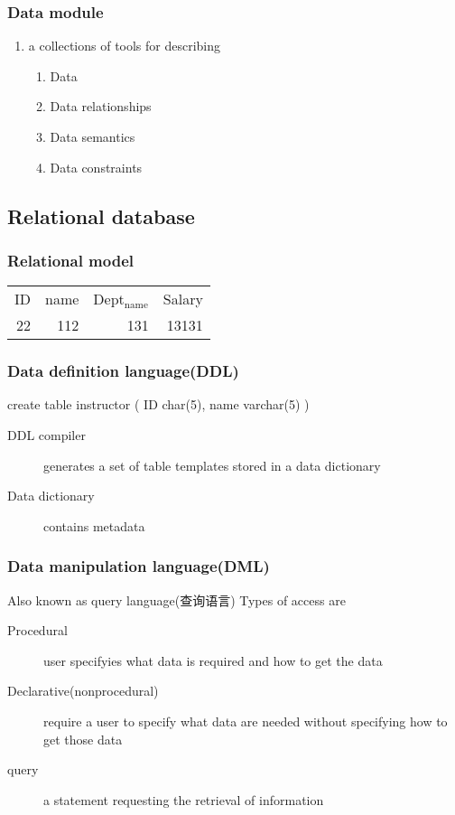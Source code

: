 \documentclass[11pt]{article}
\begin{document}
\subsubsection{Data module}
\label{sec-1-4-3}
\begin{enumerate}
\item a collections of tools for describing
\label{sec-1-4-3-1}
\begin{enumerate}
\item Data
\item Data relationships
\item Data semantics
\item Data constraints
\end{enumerate}
\end{enumerate}
\subsection{Relational database}
\label{sec-1-5}
\subsubsection{Relational model}
\label{sec-1-5-1}
\begin{center}
\begin{tabular}{rrrr}
ID & name & Dept$_{\text{name}}$ & Salary\\
22 & 112 & 131 & 13131\\
\end{tabular}
\end{center}
\subsubsection{Data definition language(DDL)}
\label{sec-1-5-2}
create table instructor (
ID char(5),
name varchar(5)
)
\begin{description}
\item[{DDL compiler}] generates a set of table templates
stored in a data dictionary
\item[{Data dictionary}] contains metadata
\end{description}
\subsubsection{Data manipulation language(DML)}
\label{sec-1-5-3}
Also known as query language(查询语言)
Types of access are
\begin{description}
\item[{Procedural}] user specifyies what data is required
and how to get the data
\item[{Declarative(nonprocedural)}] require a user to specify
what data are needed without
specifying how to get those data
\item[{query}] a statement requesting the retrieval of information
\end{description}
\end{document}
